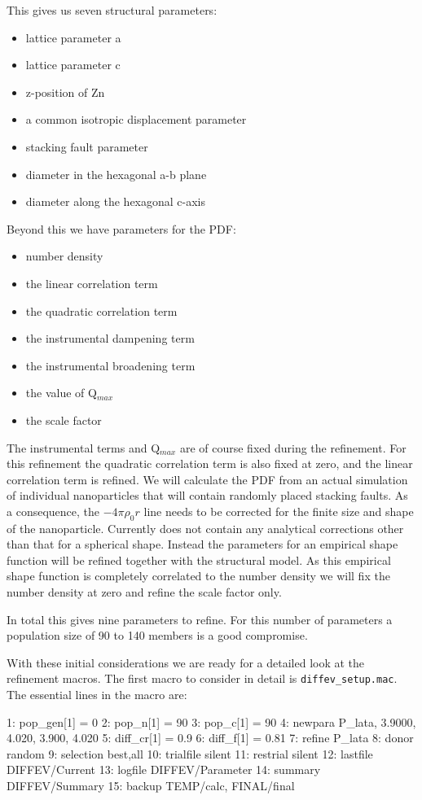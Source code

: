 This gives us seven structural parameters:

\begin{itemize}
 \item lattice parameter a 
 \item lattice parameter c 
 \item z-position of Zn
 \item a common isotropic displacement parameter
 \item stacking fault parameter
 \item diameter in the hexagonal a-b plane
 \item diameter along the hexagonal c-axis
\end{itemize}

Beyond this we have parameters for the PDF:

\begin{itemize}
 \item number density
 \item the linear correlation term
 \item the quadratic correlation term
 \item the instrumental dampening term
 \item the instrumental broadening term
 \item the value of Q$_{max}$
 \item the scale factor
\end{itemize}

The instrumental terms and Q$_{max}$ are of course fixed during the refinement.
For this refinement the quadratic correlation term is also fixed at zero, and 
the linear correlation term is refined. We will calculate the PDF from an 
actual simulation of individual nanoparticles that will contain randomly
placed stacking faults. As a consequence, the $-4 \pi \rho_0 r$ line needs to
be corrected for the finite size and shape of the nanoparticle. Currently 
\Discus does not contain any analytical corrections other than that for a
spherical shape. Instead the parameters for an empirical shape function will be 
refined together with the structural model. As this empirical shape function
is completely correlated to the number density we will fix the number density at 
zero and refine the scale factor only.

In total this gives nine parameters to refine. For this number of parameters a 
population size of 90 to 140 members is a good compromise. 

With these initial considerations we are ready for a detailed look at the 
refinement macros. The first macro to consider in detail is 
{\tt diffev\_setup.mac}. The essential lines in the macro are:
\begin{MacVerbatim}
 1: pop_gen[1] =   0
 2: pop_n[1]   =  90
 3: pop_c[1]   =  90
 4: newpara    P_lata, 3.9000,  4.020,  3.900, 4.020
 5: diff_cr[1] = 0.9
 6: diff_f[1]  = 0.81
 7: refine     P_lata
 8: donor      random
 9: selection  best,all
10: trialfile  silent
11: restrial   silent
12: lastfile   DIFFEV/Current
13: logfile    DIFFEV/Parameter
14: summary    DIFFEV/Summary
15: backup TEMP/calc, FINAL/final
\end{MacVerbatim}

